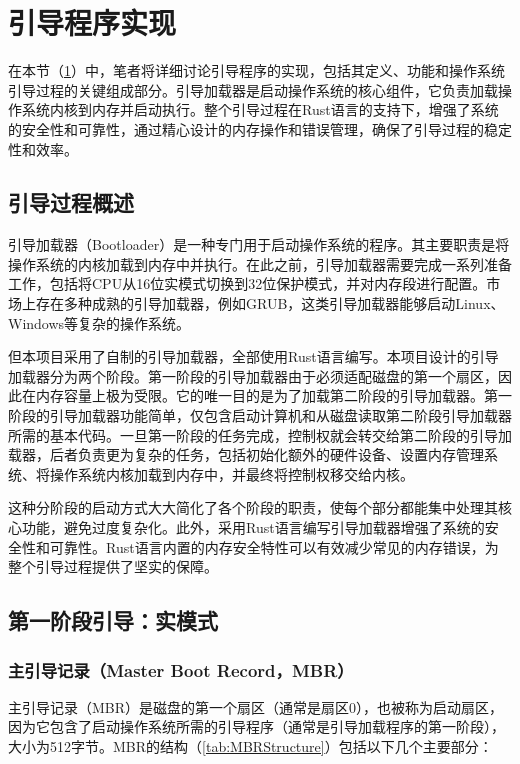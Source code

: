 \section{引导程序实现}\label{sec:BootloaderImplementation}

在本节（\cref{sec:BootloaderImplementation}）中，笔者将详细讨论引导程序的实现，包括其定义、功能和操作系统引导过程的关键组成部分。引导加载器是启动操作系统的核心组件，它负责加载操作系统内核到内存并启动执行。整个引导过程在Rust语言的支持下，增强了系统的安全性和可靠性，通过精心设计的内存操作和错误管理，确保了引导过程的稳定性和效率。

\subsection{引导过程概述}

引导加载器（Bootloader）是一种专门用于启动操作系统的程序。其主要职责是将操作系统的内核加载到内存中并执行。在此之前，引导加载器需要完成一系列准备工作，包括将CPU从16位实模式切换到32位保护模式，并对内存段进行配置。市场上存在多种成熟的引导加载器，例如GRUB，这类引导加载器能够启动Linux、Windows等复杂的操作系统。

但本项目采用了自制的引导加载器，全部使用Rust语言编写。本项目设计的引导加载器分为两个阶段。第一阶段的引导加载器由于必须适配磁盘的第一个扇区，因此在内存容量上极为受限。它的唯一目的是为了加载第二阶段的引导加载器。第一阶段的引导加载器功能简单，仅包含启动计算机和从磁盘读取第二阶段引导加载器所需的基本代码。一旦第一阶段的任务完成，控制权就会转交给第二阶段的引导加载器，后者负责更为复杂的任务，包括初始化额外的硬件设备、设置内存管理系统、将操作系统内核加载到内存中，并最终将控制权移交给内核。

这种分阶段的启动方式大大简化了各个阶段的职责，使每个部分都能集中处理其核心功能，避免过度复杂化。此外，采用Rust语言编写引导加载器增强了系统的安全性和可靠性。Rust语言内置的内存安全特性可以有效减少常见的内存错误，为整个引导过程提供了坚实的保障。

\subsection{第一阶段引导：实模式}

\subsubsection{主引导记录（Master Boot Record，MBR）}

主引导记录（MBR）是磁盘的第一个扇区（通常是扇区0），也被称为启动扇区，因为它包含了启动操作系统所需的引导程序（通常是引导加载程序的第一阶段），大小为512字节。MBR的结构（\cref{tab:MBRStructure}）包括以下几个主要部分：


